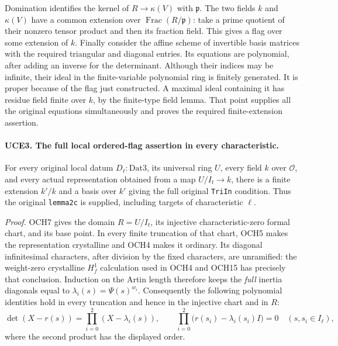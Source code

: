\documentclass[11pt,a4paper]{article}
\numberwithin{equation}{section}
\theoremstyle{remark}\newtheorem{remark}[theorem]{Remark}
\begin{document}
Domination identifies the kernel of \(R\to\kappa(V)\) with
\(\mathfrak p\).  The two fields \(k\) and \(\kappa(V)\) have a
common extension over \(\operatorname{Frac}(R/\mathfrak p)\): take
a prime quotient of their nonzero tensor product and then its
fraction field.  This gives a flag over some extension of \(k\).
Finally consider the affine scheme of invertible basis matrices
with the required triangular and diagonal entries.  Its equations
are polynomial, after adding an inverse for the determinant.
Although their indices may be infinite, their ideal in the
finite-variable polynomial ring is finitely generated.  It is proper
because of the flag just constructed.  A maximal ideal containing it
has residue field finite over \(k\), by the finite-type field lemma.
That point supplies all the original equations simultaneously and
proves the required finite-extension assertion.

\paragraph{UCE3. The full local ordered-flag assertion in every characteristic.}
\label{claim:UCE3}
For every original local datum \(D_\ell:\mathrm{Dat3}\), its
universal ring \(U\), every field \(k\) over \(\mathcal O\),
and every actual representation obtained from a map
\(U/I_t\to k\), there is a finite extension \(k'/k\) and a
basis over \(k'\) giving the full original \texttt{Tri\allowbreak In} condition.
Thus the original \texttt{lemma2c} is supplied, including targets
of characteristic \(\ell\).

\emph{Proof.}
OCH7 gives the domain \(R=U/I_t\), its injective characteristic-zero
formal chart, and its base point.  In every finite truncation of that
chart, OCH5 makes the representation crystalline and OCH4 makes it
ordinary.  Its diagonal infinitesimal characters, after division by
the fixed characters, are unramified: the weight-zero crystalline
\(H^1_f\) calculation used in OCH4 and OCH15 has precisely that
conclusion.  Induction on the Artin length therefore keeps the
\emph{full} inertia diagonals equal to
\(\lambda_i(s)=\Psi(s)^{w_i}\).
Consequently the following polynomial identities hold in every
truncation and hence in the injective chart and in \(R\):
\[
 \det(X-r(s))=\prod_{i=0}^2(X-\lambda_i(s)),\qquad
 \prod_{i=0}^2\bigl(r(s_i)-\lambda_i(s_i)I\bigr)=0
       \quad(s,s_i\in I_\ell),
 \tag{UCE.3}
\]
where the second product has the displayed order.
\end{document}
